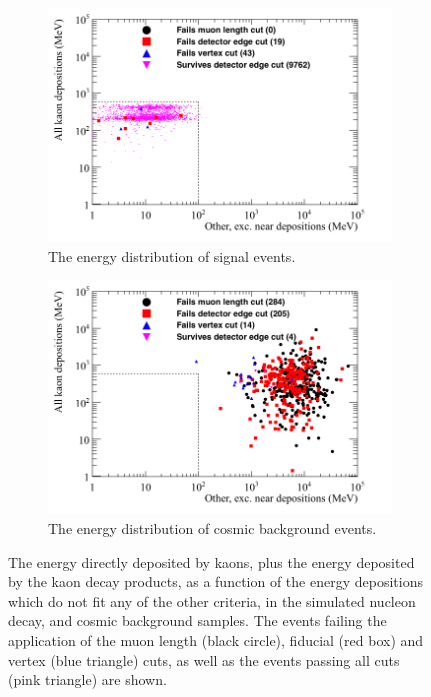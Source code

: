 \begin{figure}[h!]
  \centering
  \begin{subfigure}{0.8\textwidth}
    \includegraphics[width=\textwidth]{NucleonDecay_AllKaon_vs_Other_Can}
    \caption{The energy distribution of signal events.}
    \label{fig:NDK_AllKaon_Other_EDist_Sig}
  \end{subfigure}
  \begin{subfigure}{0.8\textwidth}
    \includegraphics[width=\textwidth]{CosmicBackground_AllKaon_vs_Other_Can}
    \caption{The energy distribution of cosmic background events.}
    \label{fig:NDK_AllKaon_Other_EDist_Cosmo}
  \end{subfigure}
  \caption[The energy directly deposited by kaons, plus the energy deposited by the kaon decay products, as a function of the energy depositions which do not fit any of the other criteria, in the simulated nucleon decay, and cosmic background samples]
          {The energy directly deposited by kaons, plus the energy deposited by the kaon decay products, as a function of the energy depositions which do not fit any of the other criteria, in the simulated nucleon decay, and cosmic background samples. The events failing the application of the muon length (black circle), fiducial (red box) and vertex (blue triangle) cuts, as well as the events passing all cuts (pink triangle) are shown.}
  \label{fig:NDK_AllKaon_Other_EDist}
\end{figure}

